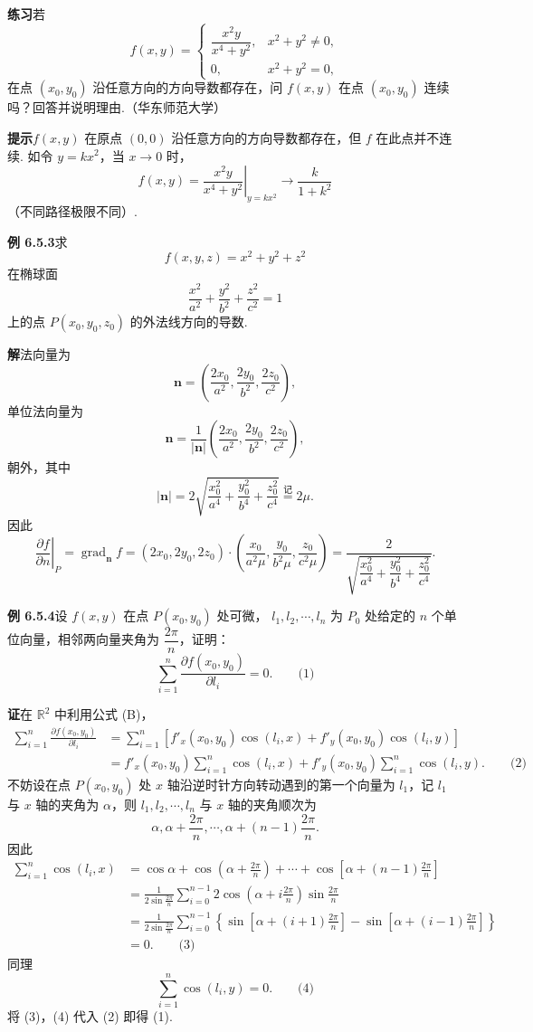 \documentclass[UTF8, 12pt, fontset=fandol, oneside]{ctexart}
\begin{document}
\noindent\textbf{练习}\quad 若
\[
f(x,y)=
\begin{cases}
  \dfrac{x^2y}{x^4+y^2},&x^2+y^2\ne0,\\[6pt]
  0,&x^2+y^2=0,
\end{cases}
\]
在点 $(x_0,y_0)$ 沿任意方向的方向导数都存在，问 $f(x,y)$ 在点 $(x_0,y_0)$ 连续吗？回答并说明理由.（华东师范大学）

\noindent\textbf{提示}\quad $f(x,y)$ 在原点 $(0,0)$ 沿任意方向的方向导数都存在，但 $f$ 在此点并不连续. 如令 $y=kx^2$，当 $x\to0$ 时，
\[
  f(x,y)=\left.\frac{x^2y}{x^4+y^2}\right|_{y=kx^2}
  \to \frac{k}{1+k^2}
\]
（不同路径极限不同）.

\noindent\textbf{例 6.5.3}\quad 求
\[
  f(x,y,z)=x^2+y^2+z^2
\]
在椭球面
\[
  \frac{x^2}{a^2}+\frac{y^2}{b^2}+\frac{z^2}{c^2}=1
\]
上的点 $P(x_0,y_0,z_0)$ 的外法线方向的导数.

\noindent\textbf{解}\quad 法向量为
\[
  \mathbf n=\left(\frac{2x_0}{a^2},\frac{2y_0}{b^2},\frac{2z_0}{c^2}\right),
\]
单位法向量为
\[
  \mathbf n=\frac1{|\mathbf n|}
  \left(\frac{2x_0}{a^2},\frac{2y_0}{b^2},\frac{2z_0}{c^2}\right),
\]
朝外，其中
\[
  |\mathbf n|
  =2\sqrt{\frac{x_0^2}{a^4}+\frac{y_0^2}{b^4}+\frac{z_0^2}{c^4}}
  \overset{\text{记}}{=}2\mu.
\]
因此
\[
\left.\frac{\partial f}{\partial n}\right|_P
=\operatorname{grad}_{\mathbf n}f
=(2x_0,2y_0,2z_0)\cdot
\left(\frac{x_0}{a^2\mu},\frac{y_0}{b^2\mu},\frac{z_0}{c^2\mu}\right)
=
\frac{2}{\sqrt{\dfrac{x_0^2}{a^4}+\dfrac{y_0^2}{b^4}+\dfrac{z_0^2}{c^4}}}.
\]

\noindent\textbf{例 6.5.4}\quad 设 $f(x,y)$ 在点 $P(x_0,y_0)$ 处可微，
$l_1,l_2,\cdots,l_n$ 为 $P_0$ 处给定的 $n$ 个单位向量，相邻两向量夹角为
$\dfrac{2\pi}{n}$，证明：
\[
  \sum_{i=1}^n\frac{\partial f(x_0,y_0)}{\partial l_i}=0. \qquad\text{(1)}
\]

\noindent\textbf{证}\quad 在 $\mathbb R^2$ 中利用公式 (B)，
\[
\begin{aligned}
  \sum_{i=1}^n\frac{\partial f(x_0,y_0)}{\partial l_i}
  &=
  \sum_{i=1}^n\left[f'_x(x_0,y_0)\cos(l_i,x)
  +f'_y(x_0,y_0)\cos(l_i,y)\right]\\
  &=f'_x(x_0,y_0)\sum_{i=1}^n\cos(l_i,x)
  +f'_y(x_0,y_0)\sum_{i=1}^n\cos(l_i,y). \qquad\text{(2)}
\end{aligned}
\]
不妨设在点 $P(x_0,y_0)$ 处 $x$ 轴沿逆时针方向转动遇到的第一个向量为 $l_1$，记 $l_1$ 与 $x$ 轴的夹角为 $\alpha$，则
$l_1,l_2,\cdots,l_n$ 与 $x$ 轴的夹角顺次为
\[
  \alpha,\alpha+\frac{2\pi}{n},\cdots,\alpha+(n-1)\frac{2\pi}{n}.
\]
因此
\[
\begin{aligned}
  \sum_{i=1}^n\cos(l_i,x)
  &=
  \cos\alpha+\cos\left(\alpha+\frac{2\pi}{n}\right)+\cdots+
  \cos\left[\alpha+(n-1)\frac{2\pi}{n}\right]\\
  &=
  \frac1{2\sin\frac{2\pi}{n}}
  \sum_{i=0}^{n-1}
  2\cos\left(\alpha+i\frac{2\pi}{n}\right)\sin\frac{2\pi}{n}\\
  &=
  \frac1{2\sin\frac{2\pi}{n}}
  \sum_{i=0}^{n-1}
  \left\{
  \sin\left[\alpha+(i+1)\frac{2\pi}{n}\right]
  -
  \sin\left[\alpha+(i-1)\frac{2\pi}{n}\right]
  \right\}\\
  &=0. \qquad\text{(3)}
\end{aligned}
\]
同理
\[
  \sum_{i=1}^n\cos(l_i,y)=0. \qquad\text{(4)}
\]
将 (3)，(4) 代入 (2) 即得 (1).
\end{document}
